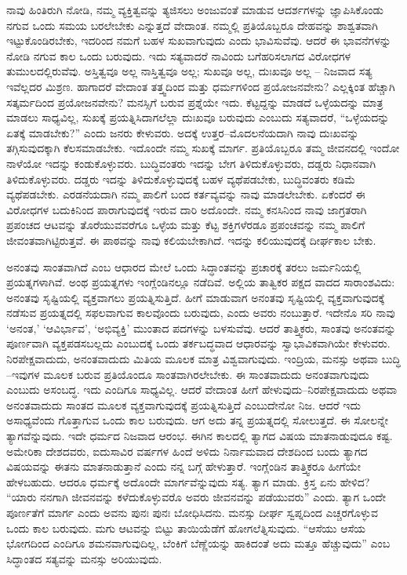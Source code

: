 ನಾವು ಹಿಂತಿರುಗಿ ನೋಡಿ, ನಮ್ಮ ವ್ಯಕ್ತಿತ್ವವನ್ನು ತ್ಯಜಿಸಲು ಅಂಜುವಂತೆ ಮಾಡುವ ಆದರ್ಶಗಳನ್ನು ಜ್ಞಾಪಿಸಿಕೊಂಡು ನಗುವ ಒಂದು ಸಮಯ ಬರಲೇಬೇಕು ಎನ್ನುತ್ತದೆ ವೇದಾಂತ. ನಮ್ಮಲ್ಲಿ ಪ್ರತಿಯೊಬ್ಬರೂ ದೇಹವನ್ನು ಶಾಶ್ವತವಾಗಿ ಇಟ್ಟುಕೊಂಡಿರಬೇಕು, ಇದರಿಂದ ನಮಗೆ ಬಹಳ ಸುಖವಾಗುವುದು ಎಂದು ಭಾವಿಸುವೆವು. ಆದರೆ ಈ ಭಾವನೆಗಳನ್ನು ನೋಡಿ ನಗುವ ಕಾಲ ಒಂದು ಬರುವುದು. ಇದು ಸತ್ಯವಾದರೆ ನಾವಿಂದು ಬಗೆಹರಿಸಲಾಗದ ವಿರೋಧಗಳ ತುಮುಲದಲ್ಲಿರುವೆವು. ಅಸ್ತಿತ್ವವೂ ಅಲ್ಲ ನಾಸ್ತಿತ್ವವೂ ಅಲ್ಲ; ಸುಖವೂ ಅಲ್ಲ, ದುಃಖವೂ ಅಲ್ಲ – ನಿಜವಾದ ಸತ್ಯ ಇವೆಲ್ಲದರ ಮಿಶ್ರಣ. ಹಾಗಾದರೆ ವೇದಾಂತ ತತ್ತ್ವದಿಂದ ಮತ್ತು ಧರ್ಮಗಳಿಂದ ಪ್ರಯೋಜನವೇನು? ಎಲ್ಲಕ್ಕಿಂತ ಹೆಚ್ಚಾಗಿ ಸತ್ಕರ್ಮದಿಂದ ಪ್ರಯೋಜನವೇನು? ಮನಸ್ಸಿಗೆ ಬರುವ ಪ್ರಶ್ನೆಯೇ ಇದು. ಕೆಟ್ಟದ್ದನ್ನು ಮಾಡದೆ ಒಳ್ಳೆಯದನ್ನು ಮಾತ್ರ ಮಾಡಲು ಸಾಧ್ಯವಿಲ್ಲ, ಸುಖಕ್ಕೆ ಪ್ರಯತ್ನಿಸಿದಾಗಲೆಲ್ಲಾ ದುಃಖವೂ ಬರುವುದು ಎಂಬುದು ಸತ್ಯವಾದರೆ, “ಒಳ್ಳೆಯದನ್ನು ಏತಕ್ಕೆ ಮಾಡಬೇಕು?” ಎಂದು ಜನರು ಕೇಳುವರು. ಅದಕ್ಕೆ ಉತ್ತರ–ಮೊದಲನೆಯದಾಗಿ ನಾವು ದುಃಖವನ್ನು ತಗ್ಗಿಸುವುದಕ್ಕಾಗಿ ಕೆಲಸಮಾಡಬೇಕು. ಇದೊಂದೇ ನಮ್ಮ ಸುಖಕ್ಕೆ ಮಾರ್ಗ. ಪ್ರತಿಯೊಬ್ಬರೂ ತಮ್ಮ ಜೀವನದಲ್ಲಿ ಇಂದೋ ನಾಳೆಯೋ ಇದನ್ನು ಕಂಡುಕೊಳ್ಳುವರು. ಬುದ್ಧಿವಂತರು ಇದನ್ನು ಬೇಗ ತಿಳಿದುಕೊಳ್ಳುವರು, ದಡ್ಡರು ನಿಧಾನವಾಗಿ ತಿಳಿದುಕೊಳ್ಳುವರು. ದಡ್ಡರು ಇದನ್ನು ತಿಳಿದುಕೊಳ್ಳುವುದಕ್ಕೆ ಬಹಳ ವ್ಯಥೆಪಡಬೇಕು, ಬುದ್ಧಿವಂತರು ಕಡಿಮೆ ವ್ಯಥೆಪಡಬೇಕು. ಎರಡನೆಯದಾಗಿ ನಮ್ಮ ಪಾಲಿಗೆ ಬಂದ ಕರ್ತವ್ಯವನ್ನು ನಾವು ಮಾಡಲೇಬೇಕು. ಏಕೆಂದರೆ ಈ ವಿರೋಧಗಳ ಬದುಕಿನಿಂದ ಪಾರಾಗುವುದಕ್ಕೆ ಇರುವ ದಾರಿ ಅದೊಂದೇ. ನಮ್ಮ ಕನಸಿನಿಂದ ನಾವು ಜಾಗ್ರತರಾಗಿ ಪ್ರಪಂಚದ ಆಟವನ್ನು ತೊರೆಯುವವರೆಗೂ ಒಳ್ಳೆಯ ಮತ್ತು ಕೆಟ್ಟ ಶಕ್ತಿಗಳೆರಡೂ ಪ್ರಪಂಚವನ್ನು ನಮ್ಮ ಪಾಲಿಗೆ ಜೀವಂತವಾಗಿಟ್ಟಿರುತ್ತವೆ. ಈ ಪಾಠವನ್ನು ನಾವು ಕಲಿಯಬೇಕಾಗಿದೆ. ಇದನ್ನು ಕಲಿಯುವುದಕ್ಕೆ ದೀರ್ಘಕಾಲ ಬೇಕು.

ಅನಂತವು ಸಾಂತವಾಗಿದೆ ಎಂಬ ಆಧಾರದ ಮೇಲೆ ಒಂದು ಸಿದ್ಧಾಂತವನ್ನು ಪ್ರಚಾರಕ್ಕೆ ತರಲು ಜರ್ಮನಿಯಲ್ಲಿ ಪ್ರಯತ್ನಗಳಾಗಿವೆ. ಅಂಥ ಪ್ರಯತ್ನಗಳು ಇಂಗ್ಲೆಂಡಿನಲ್ಲೂ ನಡೆದಿವೆ. ಅಲ್ಲಿಯ ತಾತ್ವಿಕರ ಪಕ್ಷದ ವಾದದ ಸಾರಾಂಶವಿದು: ಅನಂತವು ಸೃಷ್ಟಿಯಲ್ಲಿ ವ್ಯಕ್ತವಾಗಲು ಪ್ರಯತ್ನಿಸುತ್ತಿದೆ. ಹೀಗೆ ಮಾಡುವಾಗ ಅನಂತವು ಸೃಷ್ಟಿಯಲ್ಲಿ ವ್ಯಕ್ತವಾಗುವುದಕ್ಕೆ ನಡೆಸುವ ಪ್ರಯತ್ನದಲ್ಲಿ ಸಫಲವಾಗುವ ಕಾಲವೊಂದು ಬರುವುದು, ಎಂದು ಅವರು ನಂಬುತ್ತಾರೆ. ಇದೇನೊ ಸರಿ ನಾವು ‘ಅನಂತ,’ ‘ಆವಿರ್ಭಾವ’, ‘ಅಭಿವ್ಯಕ್ತಿ’ ಮುಂತಾದ ಪದಗಳನ್ನು ಬಳಸುವೆವು. ಆದರೆ ತಾತ್ತ್ವಿಕರು, ಸಾಂತವು ಅನಂತವನ್ನು ಪೂರ್ಣವಾಗಿ ವ್ಯಕ್ತಪಡಸಬಲ್ಲದು ಎಂಬುದಕ್ಕೆ ಒಂದು ತರ್ಕಬದ್ಧವಾದ ಆಧಾರವನ್ನು ಸ್ವಾಭಾವಿಕವಾಗಿಯೇ ಕೇಳುವರು. ನಿರಪೇಕ್ಷವಾದುದು, ಅನಂತವಾದುದು ಮಿತಿಯ ಮೂಲಕ ಮಾತ್ರ ವಿಶ್ವವಾಗುವುದು. ಇಂದ್ರಿಯ, ಮನಸ್ಸು ಅಥವಾ ಬುದ್ಧಿ –ಇವುಗಳ ಮೂಲಕ ಬರುವ ಪ್ರತಿಯೊಂದೂ ಸಾಂತವಾಗಿರಲೇಬೇಕು. ಈ ಸಾಂತವಾದುದು ಅನಂತವಾಗುವುದು ಎಂಬುದು ಅಸಂಬದ್ಧ. ಇದು ಎಂದಿಗೂ ಸಾಧ್ಯವಿಲ್ಲ. ಆದರೆ ವೇದಾಂತ ಹೀಗೆ ಹೇಳುವುದು–ನಿರಪೇಕ್ಷವಾದುದು ಅಥವಾ ಅನಂತವಾದುದು ಸಾಂತದ ಮೂಲಕ ವ್ಯಕ್ತವಾಗುವುದಕ್ಕೆ ಪ್ರಯತ್ನಿಸುತ್ತಿದೆ ಎಂಬುದೇನೋ ನಿಜ. ಆದರೆ ಇದು ಅಸಾಧ್ಯವೆಂದು ಗೊತ್ತಾಗುವ ಒಂದು ಕಾಲ ಬರುವುದು. ಆಗ ಅದು ತನ್ನ ಪ್ರಯತ್ನದಲ್ಲಿ ಸೋಲುತ್ತದೆ. ಈ ಸೋಲನ್ನೇ ತ್ಯಾಗವೆನ್ನುವುದು. ಇದೇ ಧರ್ಮದ ನಿಜವಾದ ಆರಂಭ. ಈಗಿನ ಕಾಲದಲ್ಲಿ ತ್ಯಾಗದ ವಿಷಯ ಮಾತನಾಡುವುದೂ ಕಷ್ಟ. ಅಮೇರಿಕಾ ದೇಶದವರು, ಐದುಸಾವಿರ ವರ್ಷಗಳ ಹಿಂದೆ ಅಳಿದು ನಿರ್ನಾಮವಾದ ದೇಶದಿಂದ ಬಂದು ತ್ಯಾಗದ ವಿಷಯವನ್ನು ಈತನು ಮಾತನಾಡುತ್ತಾನೆ ಎಂದು ನನ್ನ ಬಗ್ಗೆ ಹೇಳುತ್ತಾರೆ. ಇಂಗ್ಲೆಂಡಿನ ತಾತ್ತ್ವಿಕರೂ ಹೀಗೆಯೇ ಹೇಳಬಹುದು. ಆದರೂ ಧರ್ಮಕ್ಕೆ ಅದೊಂದೇ ಮಾರ್ಗವೆನ್ನುವುದು ಸತ್ಯ. ತ್ಯಾಗ ಮಾಡು. ಕ್ರಿಸ್ತ ಏನು ಹೇಳಿದ? “ಯಾರು ನನಗಾಗಿ ಜೀವನವನ್ನು ಕಳೆದುಕೊಳ್ಳುವರೊ ಅವರು ಜೀವನವನ್ನು ಪಡೆಯುವರು” ಎಂದು. ತ್ಯಾಗ ಒಂದೇ ಪೂರ್ಣತೆಗೆ ಮಾರ್ಗ ಎಂದು ಅವನು ಪುನಃ ಪುನಃ ಬೋಧಿಸಿದನು. ಮನಸ್ಸು ದೀರ್ಘ ಸ್ವಪ್ನದಿಂದ ಎಚ್ಚರಗೊಳ್ಳುವ ಒಂದು ಕಾಲ ಬರುವುದು. ಮಗು ಆಟವನ್ನು ಬಿಟ್ಟು ತಾಯಿಯೆಡೆಗೆ ಹೋಗಲೆತ್ನಿಸುವುದು. “ಆಸೆಯು ಆಸೆಯ ಭೋಗದಿಂದ ಎಂದಿಗೂ ಶಮನವಾಗುವುದಿಲ್ಲ, ಬೆಂಕಿಗೆ ಬೆಣ್ಣೆಯನ್ನು ಹಾಕಿದಂತೆ ಅದು ಮತ್ತೂ ಹೆಚ್ಚುವುದು” ಎಂಬ ಸಿದ್ಧಾಂತದ ಸತ್ಯವನ್ನು ಮನಸ್ಸು ಅರಿಯುವುದು.

